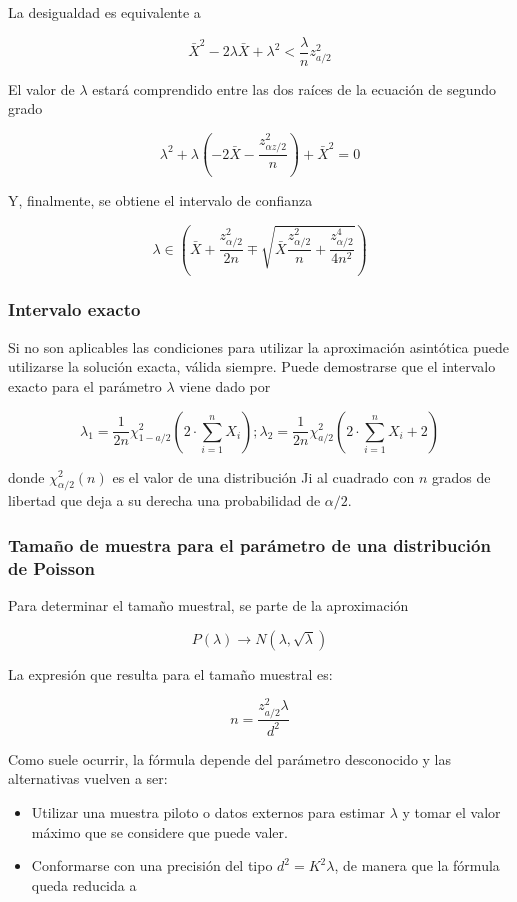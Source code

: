 \documentclass[
]{article}
\providecommand{\tightlist}{%
  \setlength{\itemsep}{0pt}\setlength{\parskip}{0pt}}
\begin{document}
La desigualdad es equivalente a

\[
\bar{X}^{2}-2 \lambda \bar{X}+\lambda^{2}<\frac{\lambda}{n} z_{a / 2}^{2}
\]

El valor de \(\lambda\) estará comprendido entre las dos raíces de la ecuación de segundo grado

\[
\lambda^{2}+\lambda\left(-2 \bar{X}-\frac{z_{\alpha z / 2}^{2}}{n}\right)+\bar{X}^{2}=0
\]

Y, finalmente, se obtiene el intervalo de confianza

\[
\lambda \in\left(\bar{X}+\frac{z_{\alpha / 2}^{2}}{2 n} \mp \sqrt{\bar{X} \frac{z_{\alpha / 2}^{2}}{n}+\frac{z_{\alpha / 2}^{4}}{4 n^{2}}}\right)
\]

\subsubsection{Intervalo exacto}\label{intervalo-exacto-1}

Si no son aplicables las condiciones para utilizar la aproximación asintótica puede utilizarse la solución exacta, válida siempre. Puede demostrarse que el intervalo exacto para el parámetro \(\lambda\) viene dado por

\[
\lambda_{1}=\frac{1}{2 n} \chi_{1-a / 2}^{2}\left(2 \cdot \sum_{i=1}^{n} X_{i}\right) ; \lambda_{2}=\frac{1}{2 n} \chi_{a / 2}^{2}\left(2 \cdot \sum_{i=1}^{n} X_{i}+2\right)
\]

donde \(\chi_{\alpha / 2}^{2}(n)\) es el valor de una distribución Ji al cuadrado con \(n\) grados de libertad que deja a su derecha una probabilidad de \(\alpha / 2\).

\subsubsection{Tamaño de muestra para el parámetro de una distribución de Poisson}\label{tamauxf1o-de-muestra-para-el-paruxe1metro-de-una-distribuciuxf3n-de-poisson}

Para determinar el tamaño muestral, se parte de la aproximación

\[
P(\lambda) \rightarrow N(\lambda, \sqrt{\lambda})
\]

La expresión que resulta para el tamaño muestral es:

\[
n=\frac{z_{a / 2}^{2} \lambda}{d^{2}}
\]

Como suele ocurrir, la fórmula depende del parámetro desconocido y las alternativas vuelven a ser:

\begin{itemize}
\tightlist
\item
  Utilizar una muestra piloto o datos externos para estimar \(\lambda\) y tomar el valor máximo que se considere que puede valer.
\item
  Conformarse con una precisión del tipo \(d^{2}=K^{2} \lambda\), de manera que la fórmula queda reducida a
\end{itemize}
\end{document}
